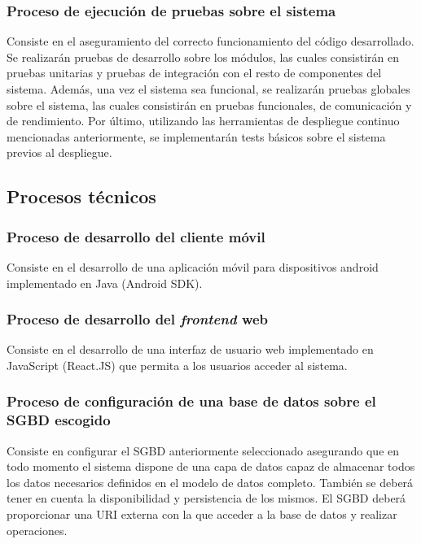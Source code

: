 \documentclass{article}
\begin{document}
\subsubsection{Proceso de ejecución de pruebas sobre el sistema} \label{P.EC.14}

Consiste en el aseguramiento del correcto funcionamiento del código desarrollado. Se realizarán pruebas de desarrollo sobre los módulos, las cuales consistirán en pruebas unitarias y pruebas de integración con el resto de componentes del sistema. Además, una vez el sistema sea funcional, se realizarán pruebas globales sobre el sistema, las cuales consistirán en pruebas funcionales, de comunicación y de rendimiento. Por último, utilizando las herramientas de despliegue continuo mencionadas anteriormente, se implementarán tests básicos sobre el sistema previos al despliegue.

\subsection{Procesos técnicos}

\subsubsection{Proceso de desarrollo del cliente móvil} \label{P.T.1}
Consiste en el desarrollo de una aplicación móvil para dispositivos android implementado en Java (Android SDK).

\subsubsection{Proceso de desarrollo del \textit{frontend} web } \label{P.T.2}
Consiste en el desarrollo de una interfaz de usuario web implementado en JavaScript (React.JS) que permita a los usuarios acceder al sistema.

\subsubsection{Proceso de configuración de una base de datos sobre el SGBD escogido} \label{P.T.3}
Consiste en configurar el SGBD anteriormente seleccionado asegurando que en todo momento el sistema dispone de una capa de datos capaz de almacenar todos los datos necesarios definidos en el modelo de datos completo. También se deberá tener en cuenta la disponibilidad y persistencia de los mismos. El SGBD deberá proporcionar una URI externa con la que acceder a la base de datos y realizar operaciones.
\end{document}
